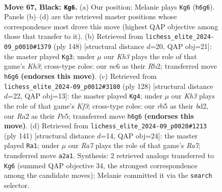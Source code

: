 \documentclass[11pt]{article}
\begin{document}
\clearpage

\begin{figure}[p]\centering
\begin{subfigure}{0.46\textwidth}\centering
\resizebox{\linewidth}{!}{%
\newchessgame
\chessboard[
  setfen={8/6p1/2N2p1k/1R5p/3P3P/6PK/r7/8 b - - 28 67},
  showmover=false,
  pgfstyle=straightmove, color=movearrow, markmove={h6-g6}
]}
\caption{}
\end{subfigure}\hfill
\begin{subfigure}{0.46\textwidth}\centering
\resizebox{\linewidth}{!}{%
\newchessgame
\chessboard[
  setfen={8/8/6k1/5p1p/3r3P/5P1K/1R4P1/8 w - - 68 75},
  showmover=false,
  pgfstyle=straightmove, color=movearrow, markmove={h3-g3}
]}
\caption{}
\end{subfigure}
\\[4pt]
\begin{subfigure}{0.46\textwidth}\centering
\resizebox{\linewidth}{!}{%
\newchessgame
\chessboard[
  setfen={8/5pk1/4p1p1/4P3/5P1p/5K1P/3b2P1/8 w - - 26 65},
  showmover=false,
  pgfstyle=straightmove, color=movearrow, markmove={f3-g4}
]}
\caption{}
\end{subfigure}\hfill
\begin{subfigure}{0.46\textwidth}\centering
\resizebox{\linewidth}{!}{%
\newchessgame
\chessboard[
  setfen={8/5p2/5kp1/1R5p/5P1P/6PK/r7/8 b - - 18 71},
  showmover=false,
  pgfstyle=straightmove, color=movearrow, markmove={a2-a1}
]}
\caption{}
\end{subfigure}
\caption{\textbf{Move 67, Black: \texttt{Kg6}.} (a) Our position; Melanie plays \texttt{Kg6} (\texttt{h6g6}). Panels (b)--(d) are the retrieved master positions whose correspondence most drove this move (highest QAP objective among those that transfer to it). (b) Retrieved from \texttt{lichess\_elite\_2024-09\_p0010\#1379} (ply 148) [structural distance $d$=20, QAP obj=21]: the master played \texttt{Kg3}; under $\mu$ our \emph{Kh3} plays the role of that game's \emph{Kh3}; cross-type roles: our \emph{n}c6 as their \emph{R}b2; transferred move \texttt{h6g6} \textbf{(endorses this move)}. (c) Retrieved from \texttt{lichess\_elite\_2024-09\_p0012\#3180} (ply 128) [structural distance $d$=22, QAP obj=13]: the master played \texttt{Kg4}; under $\mu$ our \emph{Kh3} plays the role of that game's \emph{Kf3}; cross-type roles: our \emph{r}b5 as their \emph{b}d2, our \emph{R}a2 as their \emph{P}e5; transferred move \texttt{h6g6} \textbf{(endorses this move)}. (d) Retrieved from \texttt{lichess\_elite\_2024-09\_p0028\#1213} (ply 141) [structural distance $d$=14, QAP obj=24]: the master played \texttt{Ra1}; under $\mu$ our \emph{Ra7} plays the role of that game's \emph{Ra7}; transferred move \texttt{a2a1}. Synthesis: 2 retrieved analogs transferred to \texttt{Kg6} (summed QAP objective 34, the strongest correspondence among the candidate moves); Melanie committed it via the \texttt{search} selector.}
\label{fig:thought-m133}
\end{figure}
\end{document}
